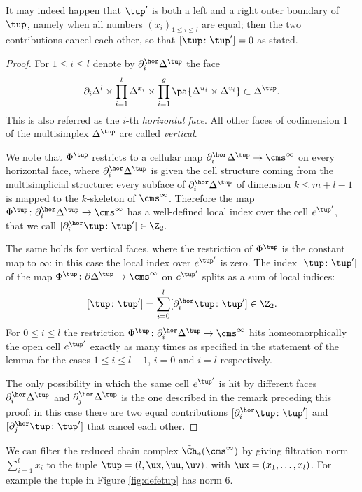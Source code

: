 It may indeed happen that $\tup'$ is both a left and a right outer boundary of $\tup$,
namely when all numbers $(x_i)_{1\leq i\leq l}$ are equal; then the two contributions cancel each other,
so that $[\tup\colon\tup']=0$ as stated.
\begin{proof}
 For $1\leq i\leq l$ denote by $\partial^{\hor}_i\Delta^{\tup}$ the face
 \[
 \partial_i\Delta^l\times\prod_{i=1}^l\Delta^{x_i}\times\prod_{i=1}^g\pa{\Delta^{u_i}\times\Delta^{v_i}}\subset\Delta^{\tup}.
 \]
 This is also referred as the $i$-th \emph{horizontal face}. All other faces of codimension 1 of
 the multisimplex $\Delta^{\tup}$ are called \emph{vertical}.
 
 We note that $\Phi^{\tup}$ restricts to a cellular map $\partial_i^{\hor}\Delta^{\tup}\to\cms^{\infty}$ on every
 horizontal face, where $\partial_i^{\hor}\Delta^{\tup}$
 is given the cell structure coming from the multisimplicial structure: every subface of $\partial_i^{\hor}\Delta^{\tup}$ of dimension
 $k\leq m+l-1$ is mapped to the $k$-skeleton of $\cms^{\infty}$. Therefore the map $\Phi^{\tup}\colon\partial_i^{\hor}\Delta^{\tup}\to\cms^{\infty}$
 has a well-defined local index over the cell $e^{\tup'}$, that
 we call $[\partial^{\hor}_i\tup\colon\tup']\in\Z_2$.

 The same holds for vertical faces, where the restriction of $\Phi^{\tup}$ is the constant map to $\infty$: in this case the local index
 over $e^{\tup'}$ is zero. The index $[\tup\colon\tup']$ of the map $\Phi^{\tup}\colon\partial\Delta^{\tup}\to\cms^{\infty}$ on
 $e^{\tup'}$ splits as a sum of local indices:
 \[
  [\tup\colon\tup']=\sum_{i=0}^l[\partial_i^{\hor}\tup\colon\tup']\in\Z_2.
 \]
 For $0\leq i\leq l$ the restriction $\Phi^{\tup}\colon\partial^{\hor}_i\Delta^{\tup}\to\cms^{\infty}$
 hits homeomorphically the open cell $e^{\tup'}$
 exactly as many times as specified in the statement
 of the lemma for the cases $1\leq i\leq l-1$,
 $i=0$ and $i=l$ respectively.
 
 The only possibility in which the same cell $e^{\tup'}$ is hit by different faces $\partial_i^{\hor}\Delta^{\tup}$
 and $\partial_j^{\hor}\Delta^{\tup}$ is the one described in the remark preceding this proof: in this case
 there are two equal contributions $[\partial_i^{\hor}\tup\colon\tup']$ and $[\partial_j^{\hor}\tup\colon\tup']$
 that cancel each other.
\end{proof}

We can filter the reduced chain complex $\tilde\Ch_*(\cms^{\infty})$ by giving filtration norm $\sum_{i=1}^lx_i$ to
the tuple $\tup=(l,\ux,\uu,\uv)$, with $\ux=(x_1,\dots,x_l)$. For example
the tuple in Figure \ref{fig:defetup} has norm 6.

